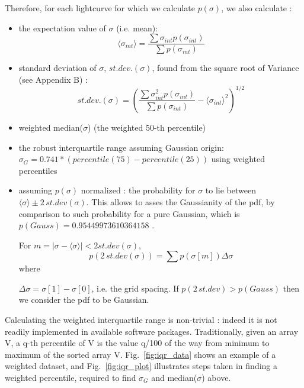 \documentclass[fleqn,usenatbib]{mnras}  %
\begin{document}
Therefore, for each lightcurve for which we calculate $p(\sigma)$, we also calculate : 
\begin{itemize}
\item the expectation value of $\sigma$ (i.e. mean):  
	\begin{equation}
	\label{eq:expectation_sigma}
	\langle \sigma_{int} \rangle= \frac{\sum \sigma_{int} p(\sigma_{int})}{\sum p(\sigma_{int})} 
	\end{equation}

\item standard deviation of $\sigma$, $st.dev.(\sigma)$, found from the square root of Variance (see Appendix B) : 
	\begin{equation}
	\label{eq:standard_deviation_sigma}
	st.dev.(\sigma)=\left(\frac{\sum \sigma_{int}^{2}p(\sigma_{int}) } {\sum p(\sigma_{int})} - \langle \sigma_{int} \rangle^{2} \right) ^{1/2}
	\end{equation}

\item weighted median($\sigma$)  (the weighted 50-th percentile)

\item the robust interquartile range assuming Gaussian origin: $\sigma_{G} = 0.741 * (percentile(75)  - percentile(25))$ using weighted percentiles 

\item assuming $p(\sigma)$ normalized : the probability for $\sigma$ to lie between  $\langle \sigma \rangle \pm 2 \, st.dev(\sigma)$. This allows to asses the Gaussianity of the pdf, by comparison to such probability for a pure Gaussian, which is $p(Gauss) = 0.95449973610364158$ .  

For $m = |\sigma - \langle \sigma \rangle| < 2 st.dev(\sigma)$,  
\begin{equation}
p(2 \, st.dev(\sigma)) = \sum{p(\sigma[m]) \Delta \sigma}
\end{equation}
where 

$\Delta \sigma = \sigma[1] - \sigma[0]$, i.e. the grid spacing. If $p(2 \, st.dev) > p(Gauss)$ then we consider the pdf to be Gaussian.  
\end{itemize}


Calculating the weighted interquartile range is non-trivial : indeed it is not readily implemented in available software packages. Traditionally, given an array V, a q-th percentile of V is the value q/100 of the way from minimum to maximum of the sorted array V.  Fig.~\ref{fig:iqr_data} shows an example of a weighted dataset, and Fig.~\ref{fig:iqr_plot}  illustrates steps taken in finding a weighted percentile, required to find $\sigma_{G}$ and  median($\sigma$) above.  
\end{document}
